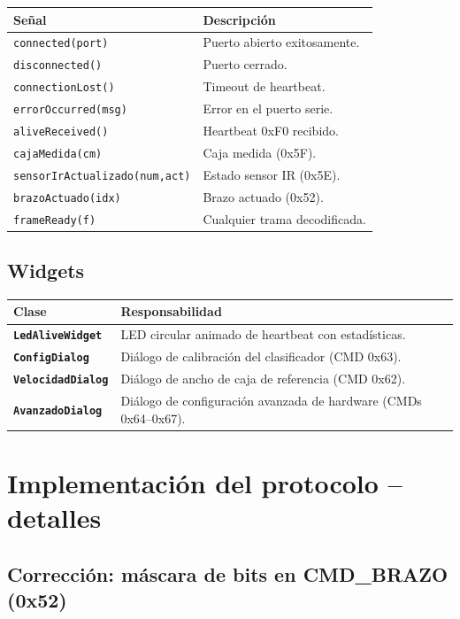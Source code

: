 \documentclass[12pt,a4paper]{report}
\newcommand{\class}[1]{\texttt{\textbf{#1}}}
\begin{document}
\begin{tabular}{lp{7cm}}
  \toprule
  \textbf{Señal} & \textbf{Descripción} \\
  \midrule
  \texttt{connected(port)} & Puerto abierto exitosamente. \\
  \texttt{disconnected()} & Puerto cerrado. \\
  \texttt{connectionLost()} & Timeout de heartbeat. \\
  \texttt{errorOccurred(msg)} & Error en el puerto serie. \\
  \texttt{aliveReceived()} & Heartbeat 0xF0 recibido. \\
  \texttt{cajaMedida(cm)} & Caja medida (0x5F). \\
  \texttt{sensorIrActualizado(num,act)} & Estado sensor IR (0x5E). \\
  \texttt{brazoActuado(idx)} & Brazo actuado (0x52). \\
  \texttt{frameReady(f)} & Cualquier trama decodificada. \\
  \bottomrule
\end{tabular}

\section{Widgets}

\begin{tabular}{lp{9cm}}
  \toprule
  \textbf{Clase} & \textbf{Responsabilidad} \\
  \midrule
  \class{LedAliveWidget} & LED circular animado de heartbeat con estadísticas. \\
  \class{ConfigDialog} & Diálogo de calibración del clasificador (CMD 0x63). \\
  \class{VelocidadDialog} & Diálogo de ancho de caja de referencia (CMD 0x62). \\
  \class{AvanzadoDialog} & Diálogo de configuración avanzada de hardware (CMDs 0x64–0x67). \\
  \bottomrule
\end{tabular}

\chapter{Implementación del protocolo -- detalles}

\section{Corrección: máscara de bits en CMD\_BRAZO (0x52)}
\end{document}
